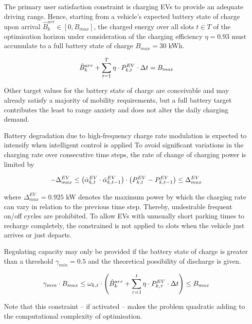 The primary user satisfaction constraint is charging EVs to provide an adequate driving range. Hence, starting from a vehicle's expected battery state of charge upon arrival $\hat{B}^{arr}_{k} \in [0,B_{max}]$, the charged energy over all slots $t \in T$ of the optimisation horizon under consideration of the charging efficiency $\eta=0.93$ must accumulate to a full battery state of charge $B_{max} = 30$ kWh.

\begin{equation}
\hat{B}^{arr}_{k}+\sum_{t=1}^{T} \eta \cdot P^{EV}_{k,t} \cdot \Delta t = B_{max}
\end{equation}

Other target values for the battery state of charge are conceivable and may already satisfy a majority of mobility requirements, but a full battery target contributes the least to range anxiety and does not alter the daily charging demand.

Battery degradation due to high-frequency charge rate modulation is expected to intensify when intelligent control is applied \cite{Peterson2010,Dogger2011} To avoid significant variations in the charging rate over consecutive time steps, the rate of change of charging power is limited by

\begin{equation}
\label{eq:crm}
-\Delta^{EV}_{max} \leq \left(\hat{\alpha}^{EV}_{k,t}\cdot\hat{\alpha}^{EV}_{k,t-1}\right)\cdot\left(P^{EV}_{k,t}-P^{EV}_{k,t-1}\right) \leq \Delta^{EV}_{max}
\end{equation}

where $\Delta^{EV}_{max} = 0.925$ kW denotes the maximum power by which the charging rate can vary in relation to the previous time step. Thereby, undesirable frequent on/off cycles are prohibited. To allow EVs with unusually short parking times to recharge completely, the constrained is not applied to slots when the vehicle just arrives or just departs.

Regulating capacity may only be provided if the battery state of charge is greater than a threshold $\gamma_{min}=0.5$ and the theoretical possibility of discharge is given.

\begin{equation}
\gamma_{min} \cdot B_{max} \leq \omega_{k,t} \cdot \left(\hat{B}^{arr}_{k} + \sum_{\tau = 1}^{t} \eta \cdot P^{EV}_{k,\tau} \cdot \Delta t\right) \leq B_{max}
\label{eq:reg_constraint}
\end{equation}

Note that this constraint -- if activated -- makes the problem quadratic adding to the computational complexity of optimisation.

